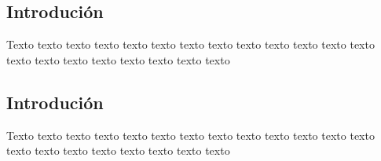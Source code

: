 \begin{refsection}


\begin{multicols}{2}


\subsection*{Introdución}

Texto texto texto texto texto texto texto texto texto texto texto texto texto
texto texto texto texto texto texto texto texto

\subsection*{Introdución}

Texto texto texto texto texto texto texto texto texto texto texto texto texto
texto texto texto texto texto texto texto texto

\printbibliography

\end{multicols}
\end{refsection}


